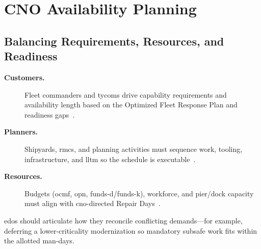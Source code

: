 \documentclass[../main.tex]{subfiles}
\begin{document}
\section{CNO Availability Planning}

\subsection{Balancing Requirements, Resources, and Readiness}
\begin{description}
  \item[\textbf{Customers.}] Fleet commanders and \ac{tycom}s drive capability requirements and availability length based on the Optimized Fleet Response Plan and readiness gaps~\autocite{OPNAVINST3000-15K,edo-4-2-1-cno-availability-planning-2025}.
  \item[\textbf{Planners.}] Shipyards, \acp{rmc}, and planning activities must sequence work, tooling, infrastructure, and \ac{lltm} so the schedule is executable~\autocite{edo-4-2-1-cno-availability-planning-2025}.
\item[\textbf{Resources.}] Budgets (\ac{ocmf}, \ac{opn}, \ac{funds-d}/\ac{funds-k}), workforce, and pier/dock capacity must align with \ac{cno}-directed Repair Days~\autocite{OPNAVNOTE4700-24}.
\end{description}
\acp{edo} should articulate how they reconcile conflicting demands—for example, deferring a lower-criticality modernization so mandatory \ac{subsafe} work fits within the allotted man-days.
\end{document}
